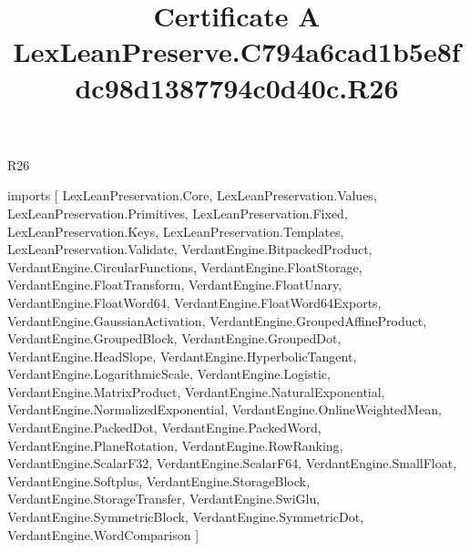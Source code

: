 \begin{lexlean}{R26}
\title{Certificate A LexLeanPreserve.C794a6cad1b5e8fdc98d1387794c0d40c.R26}
\begin{coremodule}
imports [
  LexLeanPreservation.Core,
  LexLeanPreservation.Values,
  LexLeanPreservation.Primitives,
  LexLeanPreservation.Fixed,
  LexLeanPreservation.Keys,
  LexLeanPreservation.Templates,
  LexLeanPreservation.Validate,
  VerdantEngine.BitpackedProduct,
  VerdantEngine.CircularFunctions,
  VerdantEngine.FloatStorage,
  VerdantEngine.FloatTransform,
  VerdantEngine.FloatUnary,
  VerdantEngine.FloatWord64,
  VerdantEngine.FloatWord64Exports,
  VerdantEngine.GaussianActivation,
  VerdantEngine.GroupedAffineProduct,
  VerdantEngine.GroupedBlock,
  VerdantEngine.GroupedDot,
  VerdantEngine.HeadSlope,
  VerdantEngine.HyperbolicTangent,
  VerdantEngine.LogarithmicScale,
  VerdantEngine.Logistic,
  VerdantEngine.MatrixProduct,
  VerdantEngine.NaturalExponential,
  VerdantEngine.NormalizedExponential,
  VerdantEngine.OnlineWeightedMean,
  VerdantEngine.PackedDot,
  VerdantEngine.PackedWord,
  VerdantEngine.PlaneRotation,
  VerdantEngine.RowRanking,
  VerdantEngine.ScalarF32,
  VerdantEngine.ScalarF64,
  VerdantEngine.SmallFloat,
  VerdantEngine.Softplus,
  VerdantEngine.StorageBlock,
  VerdantEngine.StorageTransfer,
  VerdantEngine.SwiGlu,
  VerdantEngine.SymmetricBlock,
  VerdantEngine.SymmetricDot,
  VerdantEngine.WordComparison
]


\end{coremodule}
\end{lexlean}
